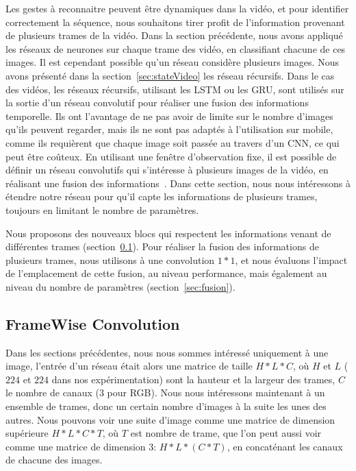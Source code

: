 Les gestes à reconnaitre peuvent être dynamiques dans la vidéo, et pour identifier correctement la séquence, nous souhaitons tirer profit de l'information provenant de plusieurs trames de la vidéo.
Dans la section précédente, nous avons appliqué les réseaux de neurones sur chaque trame des vidéo, en classifiant chacune de ces images.
Il est cependant possible qu'un réseau considère plusieurs images.
Nous avons présenté dans la section~\ref{sec:stateVideo} les réseau récursifs.
Dans le cas des vidéos, les réseaux récursifs, utilisant les LSTM ou les GRU, sont utilisés sur la sortie d'un réseau convolutif pour réaliser une fusion des informations temporelle.
Ils ont l'avantage de ne pas avoir de limite sur le nombre d'images qu'ils peuvent regarder, mais ils ne sont pas adaptés à l'utilisation sur mobile, comme ils requièrent que chaque image soit passée au travers d'un CNN, ce qui peut être coûteux.
En utilisant une fenêtre d'observation fixe, il est possible de définir un réseau convolutifs qui s'intéresse à plusieurs images de la vidéo, en réalisant une fusion des informations~\cite{karpathy2014large}.
Dans cette section, nous nous intéressons à étendre notre réseau pour qu'il capte les informations de plusieurs trames, toujours en limitant le nombre de paramètres.

Nous proposons des nouveaux blocs qui respectent les informations venant de différentes trames (section~\ref{sec:FWconv}).
Pour réaliser la fusion des informations de plusieurs trames, nous utilisons à une convolution $1*1$, et nous évaluons l'impact de l'emplacement de cette fusion, au niveau performance, mais également au niveau du nombre de paramètres (section~\ref{sec:fusion}).

\subsection{FrameWise Convolution}
\label{sec:FWconv}

Dans les sections précédentes, nous nous sommes intéressé uniquement à une image, l'entrée d'un réseau était alors une matrice de taille $H*L*C$, où $H$ et $L$ ($224$ et $224$ dans nos expérimentation) sont la hauteur et la largeur des trames, $C$ le nombre de canaux (3 pour RGB).
Nous nous intéressons maintenant à un ensemble de trames, donc un certain nombre d'images à la suite les unes des autres.
Nous pouvons voir une suite d'image comme une matrice de dimension supérieure $H*L*C*T$, où $T$ est nombre de trame, que l'on peut aussi voir comme une matrice de dimension 3: $H*L*(C*T)$, en concaténant les canaux de chacune des images.


